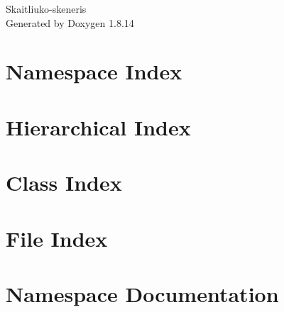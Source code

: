 \documentclass[twoside]{book}
\newcommand{\+}{\discretionary{\mbox{\scriptsize$\hookleftarrow$}}{}{}}
\newcommand{\clearemptydoublepage}{%
  \newpage{\pagestyle{empty}\cleardoublepage}%
}
\begin{document}
\hypersetup{pageanchor=false,
             bookmarksnumbered=true,
             pdfencoding=unicode
            }
\begin{titlepage}
\vspace*{7cm}
\begin{center}%
{\Large Skaitliuko-\/skeneris }\\
\vspace*{1cm}
{\large Generated by Doxygen 1.8.14}\\
\end{center}
\end{titlepage}
\clearemptydoublepage
{}
\tableofcontents
\clearemptydoublepage
{}
\hypersetup{pageanchor=true}

\chapter{Namespace Index}

\chapter{Hierarchical Index}

\chapter{Class Index}

\chapter{File Index}

\chapter{Namespace Documentation}




















\end{document}
